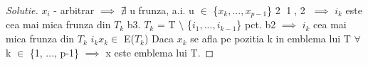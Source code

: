 \documentclass[12pt]{article}
\begin{document}
\begin{proof}[Solutie]
\newline
$x_i$ - arbitrar $\implies$ $\nexists$ u frunza, a.i. u $\in$ \{$x_k, ..., x_{p-1}$\} \textcircled{2}
\newline\newline
\textcircled{1}, \textcircled{2} $\implies$ $i_k$ este cea mai mica frunza din $T_k$
\newline\newline
b3.
\newline
$T_k$ = T $\setminus$ \{$i_1, ..., i_{k-1}$\}
\newline
pct. b2 $\implies$ $i_k$ cea mai mica frunza din $T_k$
\newline
$i_k x_k \in$ E($T_k$)
\newline
Daca $x_k$ se afla pe pozitia k in emblema lui T $\forall$ k $\in$ \{1, ..., p-1\} $\implies$ x este emblema lui T.
\end{proof}
\end{document}
